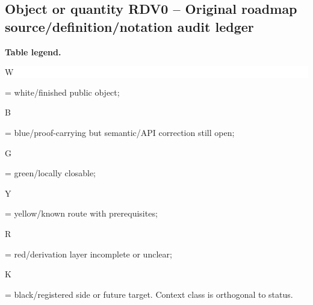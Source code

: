\subsection*{Object or quantity RDV0 -- Original roadmap source/\allowbreak{}definition/\allowbreak{}notation audit ledger}
\hypertarget{objproof:RDV0}{}
\par\smallskip\noindent\begin{minipage}{0.99\linewidth}\footnotesize\raggedright\textbf{Table legend.} \colorbox{white}{\strut W} = white/finished public object; \colorbox{cyan!20}{\strut B} = blue/proof-carrying but semantic/API correction still open; \colorbox{green!18}{\strut G} = green/locally closable; \colorbox{yellow!25}{\strut Y} = yellow/known route with prerequisites; \colorbox{red!20}{\strut R} = red/derivation layer incomplete or unclear; \colorbox{black!18}{\strut K} = black/registered side or future target. Context class is orthogonal to status.\end{minipage}\par\vspace{0.25em}
